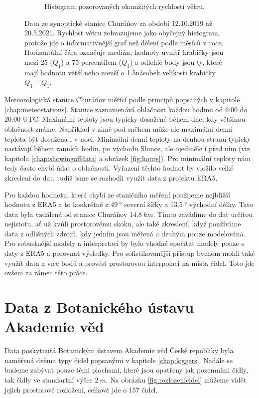 \begin{figure}
\begin{subfigure}{0.45\textwidth}
		\caption{Histogram pozorovaných okamžitých rychlostí větru.}
		\label{fig:synop_ffkmh}
	\end{subfigure}
	\caption{Data ze synoptické stanice Churáňov za období 12.10.2019 až 20.5.2021. Rychlost větru zobrazujeme jako obyčejný histogram, protože jde o informativnější graf než dělení podle měsíců v roce. Horizontální čára označuje medián, hodnoty uvnitř krabičky jsou mezi 25 ($Q_1$) a 75 percentilem ($Q_3$) a odlehlé body jsou ty, které mají hodnotu větší nebo menší o 1.5násobek velikosti krabičky $Q_3-Q_1$.}
	\label{fig:chmuukazka}
\end{figure}

Meteorologická stanice Churáňov měřící podle principů popsaných v kapitole \ref{chap:meteostations}. Stanice zaznamenává oblačnost každou hodinu od 6:00 do 20:00 UTC. Maximální teploty jsou typicky dosažené během dne, kdy většinou oblačnost známe. Například v zimě pod sněhem může ale maximální denní teplota být dosažena i v noci. Minimální denní teploty na druhou stranu typicky nastávají během ranních hodin, po východu Slunce, ale ojediněle i před ním (viz kapitola \ref{chap:showingoffdata} a obrázek \ref{fig:hours}). Pro minimální teploty nám tedy často chybí údaj o oblačnosti. Vyřazení těchto hodnot by vložilo velké zkreslení do dat, tudíž jsme se rozhodli využít data z projektu ERA5.

Pro každou hodnotu, která chybí ze staničního měření použijeme nejbližší hodnotu z ERA5 a to konkrétně z $\SI{49}{\degree}$ severní šířky a $\SI{13.5}{\degree}$ východní délky. Tato data byla vzdálená od stanice Churáňov $\SI{14.8}{km}$. Tímto zavádíme do dat určitou nejistotu, ať už kvůli prostorovému skoku, ale také zkreslení, když používáme data z odlišných zdrojů, kdy jedním jsou měřená a druhým pouze modelována. Pro robustnější modely a interpretaci by bylo vhodné spočítat modely pouze s daty z ERA5 a porovnat výsledky. Pro sofistikovanější přístup bychom mohli také využít data z více bodů a provést prostorovou interpolaci na místa čidel. Toto jde ovšem za rámec této práce.

\section{Data z Botanického ústavu Akademie věd}\label{chap:data_buav}
Data poskytnutá Botanickým ústavem Akademie věd České republiky byla naměřená dvěma typy čidel popsanými v kapitole \ref{chap:loggers}. Nadále se budeme zabývat pouze těmi plochami, které jsou opatřeny jak pozemními čidly, tak čidly ve standartní výšce $\SI{2}{m}$. Na obrázku \ref{fig:rozlozenicidel} můžeme vidět jejich prostorové rozložení, celkově jde o 157 čidel. 

